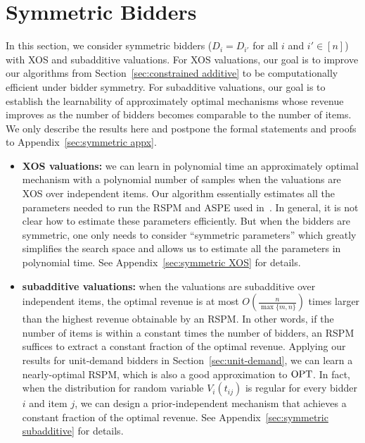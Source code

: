 \section{Symmetric Bidders}\label{sec:symmetric bidders}
In this section, we consider symmetric bidders ($D_i=D_{i'}$ for all $i$ and $i'\in[n]$) with XOS and subadditive valuations. For XOS valuations, our goal is to improve our algorithms from Section~\ref{sec:constrained additive} to be computationally efficient under bidder symmetry. For subadditive valuations, our goal is to establish the learnability of approximately optimal mechanisms whose revenue improves as the number of bidders becomes comparable to the number of items. We only describe the results here and postpone the formal statements and proofs to Appendix~\ref{sec:symmetric appx}.
 \begin{itemize}
 	\item  \textbf{XOS valuations:} we can learn in polynomial time an approximately optimal mechanism with a polynomial number of samples when the valuations are XOS over independent items. {Our algorithm essentially estimates all the parameters needed to run the RSPM and ASPE used in~\cite{CaiZ17}. In general, it is not clear how to estimate these parameters efficiently. But when the bidders are symmetric, one only needs to consider ``symmetric parameters'' which greatly simplifies the search space and allows us to estimate all the parameters in polynomial time. }See Appendix~\ref{sec:symmetric XOS} for details.
 	\item \textbf{subadditive valuations:} when the valuations are subadditive over independent items,  the optimal revenue is at most $O\left(\frac{n}{\max\{m,n\}}\right)$ times larger than the highest revenue obtainable by an RSPM. In other words, if the number of items is within a constant times the number of bidders, an RSPM suffices to extract a constant fraction of the optimal revenue.  Applying our results for unit-demand bidders in Section~\ref{sec:unit-demand}, we can learn a nearly-optimal RSPM, which is also a good approximation to $\text{OPT}$. In fact, when the distribution for random variable $V_i(t_{ij})$ is regular for every bidder $i$ and item $j$, we can design a prior-independent mechanism that achieves a constant fraction of the optimal revenue. See Appendix~\ref{sec:symmetric subadditive} for details.
 \end{itemize}
 
